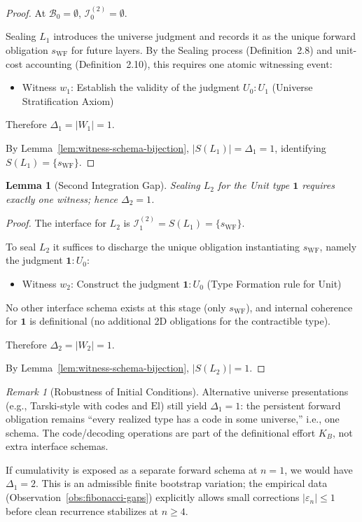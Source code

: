 \documentclass[11pt]{article}
\newtheorem{lemma}[theorem]{Lemma}
\theoremstyle{definition}
\theoremstyle{remark}
\newtheorem{remark}[theorem]{Remark}
\begin{document}
\begin{proof}
At $\mathcal{B}_0 = \emptyset$, $\mathcal{I}_0^{(2)} = \emptyset$.

Sealing $L_1$ introduces the universe judgment and records it as the unique forward obligation
$s_{\text{WF}}$ for future layers. By the Sealing process (Definition~2.8) and unit-cost accounting
(Definition~2.10), this requires one atomic witnessing event:

\begin{itemize}
\item Witness $w_1$: Establish the validity of the judgment $U_0 : U_1$ (Universe Stratification
Axiom)
\end{itemize}

Therefore $\Delta_1 = |W_1| = 1$.

By Lemma~\ref{lem:witness-schema-bijection}, $|S(L_1)| = \Delta_1 = 1$, identifying
$S(L_1) = \{s_{\text{WF}}\}$.
\end{proof}

\begin{lemma}[Second Integration Gap]
\label{lem:delta-two}
Sealing $L_2$ for the Unit type $\mathbf{1}$ requires exactly one witness; hence $\Delta_2 = 1$.
\end{lemma}

\begin{proof}
The interface for $L_2$ is $\mathcal{I}_1^{(2)} = S(L_1) = \{s_{\text{WF}}\}$.

To seal $L_2$ it suffices to discharge the unique obligation instantiating $s_{\text{WF}}$, namely the
judgment $\mathbf{1} : U_0$:

\begin{itemize}
\item Witness $w_2$: Construct the judgment $\mathbf{1} : U_0$ (Type Formation rule for Unit)
\end{itemize}

No other interface schema exists at this stage (only $s_{\text{WF}}$), and internal coherence for $\mathbf{1}$
is definitional (no additional 2D obligations for the contractible type).

Therefore $\Delta_2 = |W_2| = 1$.

By Lemma~\ref{lem:witness-schema-bijection}, $|S(L_2)| = 1$.
\end{proof}

\begin{remark}[Robustness of Initial Conditions]
Alternative universe presentations (e.g., Tarski-style with codes and $\text{El}$) still yield $\Delta_1 = 1$:
the persistent forward obligation remains ``every realized type has a code in some universe,'' i.e.,
one schema. The code/decoding operations are part of the definitional effort $K_B$, not extra
interface schemas.

If cumulativity is exposed as a separate forward schema at $n=1$, we would have $\Delta_1 = 2$. This
is an admissible finite bootstrap variation; the empirical data (Observation~\ref{obs:fibonacci-gaps})
explicitly allows small corrections $|\varepsilon_n| \leq 1$ before clean recurrence stabilizes at $n \geq 4$.
\end{remark}
\end{document}
